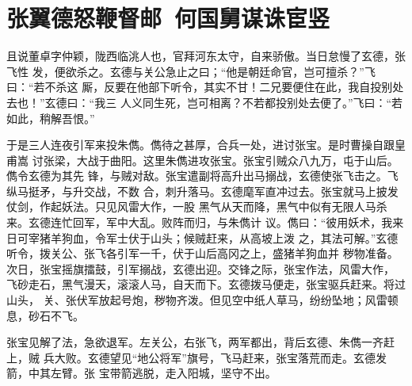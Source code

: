 \chapter{张翼德怒鞭督邮~何国舅谋诛宦竖}

且说董卓字仲颖，陇西临洮人也，官拜河东太守，自来骄傲。当日怠慢了玄德，张飞性
发，便欲杀之。玄德与关公急止之曰；“他是朝廷命官，岂可擅杀？”飞曰：“若不杀这
厮，反要在他部下听令，其实不甘！二兄要便住在此，我自投别处去也！”玄德曰：“我三
人义同生死，岂可相离？不若都投别处去便了。”飞曰：“若如此，稍解吾恨。”

于是三人连夜引军来投朱儁。儁待之甚厚，合兵一处，进讨张宝。是时曹操自跟皇甫嵩
讨张梁，大战于曲阳。这里朱儁进攻张宝。张宝引贼众八九万，屯于山后。儁令玄德为其先
锋，与贼对敌。张宝遣副将高升出马搦战，玄德使张飞击之。飞纵马挺矛，与升交战，不数
合，刺升落马。玄德麾军直冲过去。张宝就马上披发仗剑，作起妖法。只见风雷大作，一股
黑气从天而降，黑气中似有无限人马杀来。玄德连忙回军，军中大乱。败阵而归，与朱儁计
议。儁曰：“彼用妖术，我来日可宰猪羊狗血，令军士伏于山头；候贼赶来，从高坡上泼
之，其法可解。”玄德听令，拨关公、张飞各引军一千，伏于山后高冈之上，盛猪羊狗血并
秽物准备。次日，张宝摇旗擂鼓，引军搦战，玄德出迎。交锋之际，张宝作法，风雷大作，
飞砂走石，黑气漫天，滚滚人马，自天而下。玄德拨马便走，张宝驱兵赶来。将过山头，
关、张伏军放起号炮，秽物齐泼。但见空中纸人草马，纷纷坠地；风雷顿息，砂石不飞。

张宝见解了法，急欲退军。左关公，右张飞，两军都出，背后玄德、朱儁一齐赶上，贼
兵大败。玄德望见“地公将军”旗号，飞马赶来，张宝落荒而走。玄德发箭，中其左臂。张
宝带箭逃脱，走入阳城，坚守不出。

